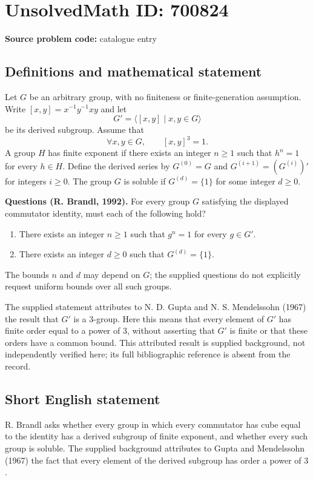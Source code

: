 \documentclass[11pt]{article}
\begin{document}
\section*{UnsolvedMath ID: 700824}
\textbf{Source problem code:} catalogue entry
\subsection{Definitions and mathematical statement}
Let \(G\) be an arbitrary group, with no finiteness or finite-generation assumption. Write \([x,y]=x^{-1}y^{-1}xy\) and let
\[
G'=\langle [x,y]\mid x,y\in G\rangle
\]
be its derived subgroup. Assume that
\[
\forall x,y\in G,\qquad [x,y]^3=1.
\]
A group \(H\) has finite exponent if there exists an integer \(n\geq 1\) such that \(h^n=1\) for every \(h\in H\). Define the derived series by \(G^{(0)}=G\) and \(G^{(i+1)}=(G^{(i)})'\) for integers \(i\geq 0\). The group \(G\) is soluble if \(G^{(d)}=\{1\}\) for some integer \(d\geq 0\).

\textbf{Questions (R. Brandl, 1992).} For every group \(G\) satisfying the displayed commutator identity, must each of the following hold?
\begin{enumerate}
\item There exists an integer \(n\geq 1\) such that \(g^n=1\) for every \(g\in G'\).
\item There exists an integer \(d\geq 0\) such that \(G^{(d)}=\{1\}\).
\end{enumerate}
The bounds \(n\) and \(d\) may depend on \(G\); the supplied questions do not explicitly request uniform bounds over all such groups.

The supplied statement attributes to N. D. Gupta and N. S. Mendelssohn (1967) the result that \(G'\) is a \(3\)-group. Here this means that every element of \(G'\) has finite order equal to a power of \(3\), without asserting that \(G'\) is finite or that these orders have a common bound. This attributed result is supplied background, not independently verified here; its full bibliographic reference is absent from the record.
\subsection{Short English statement}
R. Brandl asks whether every group in which every commutator has cube equal to the identity has a derived subgroup of finite exponent, and whether every such group is soluble. The supplied background attributes to Gupta and Mendelssohn (1967) the fact that every element of the derived subgroup has order a power of \(3\).
\end{document}
